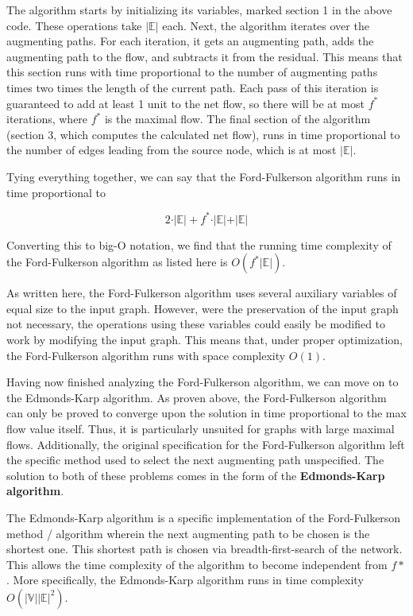 \documentclass[12pt]{amsart}
\begin{document}
    The algorithm starts by initializing its variables, marked
    section 1 in the above code. These operations take
    $\vert \mathbb{E} \vert$ each. Next, the algorithm iterates
    over the augmenting paths. For each iteration, it gets an
    augmenting path, adds the augmenting path to the flow, and
    subtracts it from the residual. This means that this section
    runs with time proportional to the number of augmenting
    paths times two times the length of the current path. Each
    pass of this iteration is guaranteed to add at least 1 unit
    to the net flow, so there will be at most $f^*$ iterations,
    where $f^*$ is the maximal flow. The final section of the
    algorithm (section 3, which computes the calculated net
    flow), runs in time proportional to the number of edges
    leading from the source node, which is at most
    $\vert \mathbb{E} \vert$.

    Tying everything together, we can say that the
    Ford-Fulkerson algorithm runs in time proportional to

\[
    2 \cdot \vert \mathbb{E} \vert + f^* \cdot \vert \mathbb{E} \vert + \vert \mathbb{E} \vert
\]

    Converting this to big-O notation, we find that the running
    time complexity of the Ford-Fulkerson algorithm as listed
    here is $O(f^* \vert \mathbb{E} \vert )$.

    As written here, the Ford-Fulkerson algorithm uses several
    auxiliary variables of equal size to the input graph.
    However, were the preservation of the input graph not
    necessary, the operations using these variables could easily
    be modified to work by modifying the input graph. This
    means that, under proper optimization, the Ford-Fulkerson
    algorithm runs with space complexity $O(1)$.

    Having now finished analyzing the Ford-Fulkerson algorithm,
    we can move on to the Edmonds-Karp algorithm. As proven
    above, the Ford-Fulkerson algorithm can only be proved to
    converge upon the solution in time proportional to the max
    flow value itself. Thus, it is particularly unsuited for
    graphs with large maximal flows. Additionally, the original
    specification for the Ford-Fulkerson algorithm left the
    specific method used to select the next augmenting path
    unspecified. The solution to both of these problems comes
    in the form of the \textbf{Edmonds-Karp algorithm}.

    The Edmonds-Karp algorithm is a specific implementation of
    the Ford-Fulkerson method / algorithm wherein the next
    augmenting path to be chosen is the shortest one. This
    shortest path is chosen via breadth-first-search of the
    network. This allows the time complexity of the algorithm
    to become independent from $f*$. More specifically, the
    Edmonds-Karp algorithm runs in time complexity
    $O(\vert \mathbb{V} \vert \vert \mathbb{E} \vert ^2)$.
\end{document}

